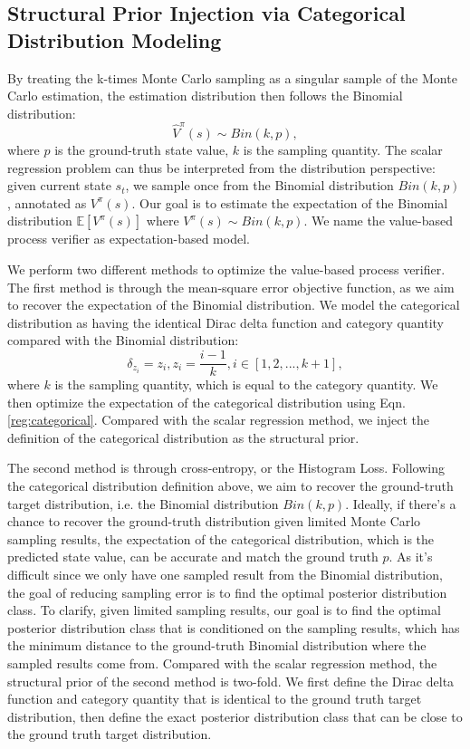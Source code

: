 \subsection{Structural Prior Injection via Categorical Distribution Modeling}
By treating the k-times Monte Carlo sampling as a singular sample of the Monte Carlo estimation, the estimation distribution then follows the Binomial distribution:
\begin{equation}\label{mtd:mc_distribution}
    \hat{V}^\pi(s)\sim Bin(k,p),
\end{equation}
where $p$ is the ground-truth state value, $k$ is the sampling quantity. The scalar regression problem can thus be interpreted from the distribution perspective: given current state $s_t$, we sample once from the Binomial distribution $Bin(k,p)$, annotated as $V^\pi(s)$. Our goal is to estimate the expectation of the Binomial distribution $\mathbb{E}[V^\pi(s)]$ where $V^\pi(s)\sim Bin(k,p)$.  We name the value-based process verifier as expectation-based model.

We perform two different methods to optimize the value-based process verifier. The first method is through the mean-square error objective function, as we aim to recover the expectation of the Binomial distribution. We model the categorical distribution as having the identical Dirac delta function and category quantity compared with the Binomial distribution:
\begin{equation}
    \delta_{z_i}=z_i,z_i=\frac{i-1}{k},i\in[1,2,...,k+1],
\end{equation}
where $k$ is the sampling quantity, which is equal to the category quantity. We then optimize the expectation of the categorical distribution using Eqn.\ref{reg:categorical}. Compared with the scalar regression method, we inject the definition of the categorical distribution as the structural prior. 

The second method is through cross-entropy, or the Histogram Loss. Following the categorical distribution definition above, we aim to recover the ground-truth target distribution, i.e. the Binomial distribution $Bin(k,p)$. Ideally, if there's a chance to recover the ground-truth distribution given limited Monte Carlo sampling results, the expectation of the categorical distribution, which is the predicted state value, can be accurate and match the ground truth $p$. As it's difficult since we only have one sampled result from the Binomial distribution, the goal of reducing sampling error is to find the optimal posterior distribution class. To clarify, given limited sampling results, our goal is to find the optimal posterior distribution class that is conditioned on the sampling results, which has the minimum distance to the ground-truth Binomial distribution where the sampled results come from. Compared with the scalar regression method, the structural prior of the second method is two-fold. We first define the Dirac delta function and category quantity that is identical to the ground truth target distribution, then define the exact posterior distribution class that can be close to the ground truth target distribution. 

